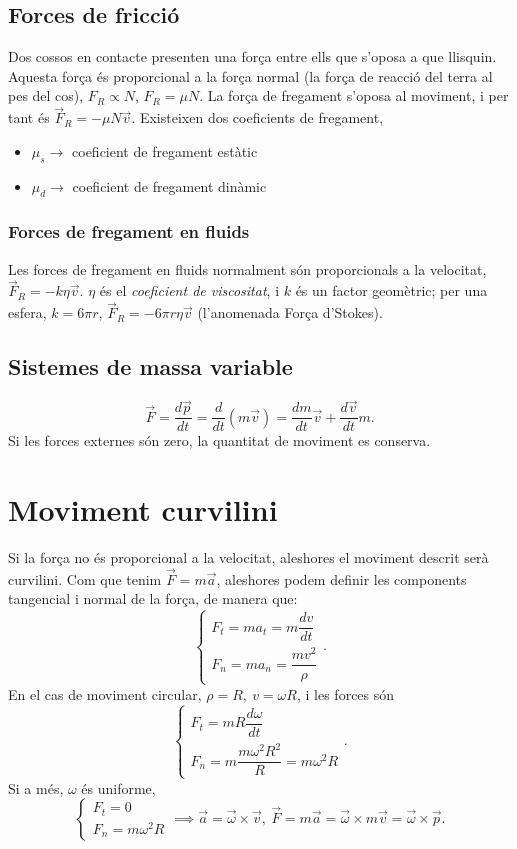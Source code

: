 \subsection{Forces de fricció}
Dos cossos en contacte presenten una força entre ells que s'oposa a que llisquin. Aquesta força és proporcional a la força normal (la força de reacció del terra al pes del cos), $F_R\propto N$, $F_R=\mu N$. La força de fregament s'oposa al moviment, i per tant és $\vec F_R=-\mu N\vec v$. Existeixen dos coeficients de fregament,
\begin{itemize}
	\item $\mu_s\longrightarrow$ coeficient de fregament estàtic
	\item $\mu_d\longrightarrow$ coeficient de fregament dinàmic
\end{itemize}
\subsubsection{Forces de fregament en fluids}
Les forces de fregament en fluids normalment són proporcionals a la velocitat, $\vec F_R=-k\eta\vec v$. $\eta$ és el \textit{coeficient de viscositat}, i $k$ és un factor geomètric; per una esfera, $k=6\pi r$, $\vec F_R=-6\pi r\eta\vec v$ (l'anomenada Força d'Stokes).

\subsection{Sistemes de massa variable}
\[\vec F=\dfrac{d\vec p}{dt}=\dfrac{d}{dt}(m\vec v)=\dfrac{dm}{dt}\vec v+\dfrac{d\vec v}{dt}m.\]
Si les forces externes són zero, la quantitat de moviment es conserva.

\section{Moviment curvilini}
Si la força no és proporcional a la velocitat, aleshores el moviment descrit serà curvilini. Com que tenim $\vec F=m\vec a$, aleshores podem definir les components tangencial i normal de la força, de manera que:
\[
\begin{cases}
F_t=ma_t=m\dfrac{dv}{dt}\\
F_n=ma_n=\dfrac{mv^2}{\rho}
\end{cases}.
\]
En el cas de moviment circular, $\rho=R,\ v=\omega R$, i les forces són
\[
\begin{cases}
F_t=mR\dfrac{d\omega}{dt}\\
F_n=m\dfrac{m\omega^2R^2}{R}=m\omega^2R
\end{cases}.
\]
Si a més, $\omega$ és uniforme,
\[
\begin{cases}
F_t=0\\
F_n=m\omega^2R
\end{cases}\implies\vec a=\vec\omega\times\vec v,\ \vec F=m\vec a=\vec\omega\times m\vec v=\vec\omega\times\vec p.
\]